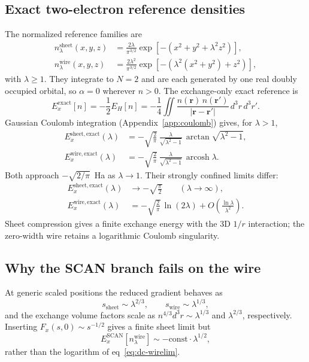 \documentclass[journal=jctcce,manuscript=article]{achemso}
\DeclareMathOperator{\arcosh}{arcosh}
\begin{document}
\subsection{Exact two-electron reference densities}
The normalized reference families are
\begin{align}
n_\lambda^{\mathrm{sheet}}(x,y,z)&=\frac{2\lambda}{\pi^{3/2}}
\exp[-(x^2+y^2+\lambda^2z^2)],
\label{eq:dc-nsheet}\\
n_\lambda^{\mathrm{wire}}(x,y,z)&=\frac{2\lambda^2}{\pi^{3/2}}
\exp[-(\lambda^2(x^2+y^2)+z^2)],
\label{eq:dc-nwire}
\end{align}
with $\lambda\ge1$.  They integrate to $N=2$ and are each generated by one
real doubly occupied orbital, so $\alpha=0$ wherever $n>0$.  The
exchange-only exact reference is
\begin{equation}
E_x^{\mathrm{exact}}[n]=-\frac12E_H[n]
=-\frac14\iint\frac{n(\mathbf r)\,n(\mathbf r')}{|\mathbf r-\mathbf r'|}\,d^3r\,d^3r'.
\label{eq:dc-exact}
\end{equation}
Gaussian Coulomb integration (Appendix~\ref{app:coulomb}) gives, for
$\lambda>1$,
\begin{align}
E_x^{\mathrm{sheet,exact}}(\lambda)&=-\sqrt{\frac{2}{\pi}}\,
\frac{\lambda}{\sqrt{\lambda^2-1}}\,\arctan\sqrt{\lambda^2-1},
\label{eq:dc-exsheet}\\
E_x^{\mathrm{wire,exact}}(\lambda)&=-\sqrt{\frac{2}{\pi}}\,
\frac{\lambda}{\sqrt{\lambda^2-1}}\,\arcosh\lambda.
\label{eq:dc-exwire}
\end{align}
Both approach $-\sqrt{2/\pi}$~Ha as $\lambda\to1$.  Their strongly confined
limits differ:
\begin{align}
E_x^{\mathrm{sheet,exact}}(\lambda)&\longrightarrow-\sqrt{\frac{\pi}{2}}
\qquad(\lambda\to\infty),
\label{eq:dc-sheetlim}\\
E_x^{\mathrm{wire,exact}}(\lambda)&=-\sqrt{\frac{2}{\pi}}\,\ln(2\lambda)
+O\!\left(\frac{\ln\lambda}{\lambda^2}\right).
\label{eq:dc-wirelim}
\end{align}
Sheet compression gives a finite exchange energy with the 3D $1/r$
interaction; the zero-width wire retains a logarithmic Coulomb singularity.

\subsection{Why the SCAN branch fails on the wire}
At generic scaled positions the reduced gradient behaves as
\begin{equation}
s_{\mathrm{sheet}}\sim\lambda^{2/3},\qquad s_{\mathrm{wire}}\sim\lambda^{1/3},
\label{eq:dc-sscaling}
\end{equation}
and the exchange volume factors scale as $n^{4/3}d^3r\sim\lambda^{1/3}$ and
$\lambda^{2/3}$, respectively.  Inserting $F_x(s,0)\sim s^{-1/2}$ gives a
finite sheet limit but
\begin{equation}
E_x^{\mathrm{SCAN}}[n_\lambda^{\mathrm{wire}}]\sim-\mathrm{const}\cdot\lambda^{1/2},
\label{eq:dc-scanwire}
\end{equation}
rather than the logarithm of eq~\ref{eq:dc-wirelim}.
\end{document}
